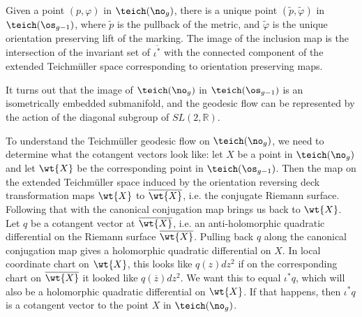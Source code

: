 \documentclass[12pt, reqno]{amsart}
\begin{document}
\begin{theorem}
  \label{thm:embedding-teich}
  Given a point $(p, \varphi)$ in $\teich(\no_g)$, there is a unique point $(\widetilde{p}, \widetilde{\varphi})$ in $\teich(\os_{g-1})$, where $\widetilde{p}$ is the pullback of the metric, and $\widetilde{\varphi}$ is the unique orientation preserving lift of the marking. The image of the inclusion map is the intersection of the invariant set of $\overline{\iota^\ast}$ with the connected component of the extended Teichmüller space corresponding to orientation preserving maps.
\end{theorem}

It turns out that the image of $\teich(\no_g)$ in $\teich(\os_{g-1})$ is an isometrically embedded submanifold, and the geodesic flow can be represented by the action of the diagonal subgroup of $SL(2, \mathbb{R})$.

To understand the Teichm\"uller geodesic flow on $\teich(\no_g)$, we need to determine what the cotangent vectors look like: let $X$ be a point in $\teich(\no_{g})$ and let $\wt{X}$ be the corresponding point in $\teich(\os_{g-1})$.
Then the map on the extended Teichmüller space induced by the orientation reversing deck transformation maps $\wt{X}$ to $\overline{\wt{X}}$, i.e. the conjugate Riemann surface. Following that with the canonical conjugation map brings us back to $\wt{X}$.
Let $q$ be a cotangent vector at $\overline{\wt{X}}$, i.e. an anti-holomorphic quadratic differential on the Riemann surface $\overline{\wt{X}}$.
Pulling back $q$ along the canonical conjugation map gives a holomorphic quadratic differential on $X$.
In local coordinate chart on $\wt{X}$, this looks like $q(z) dz^2$ if on the corresponding chart on $\overline{\wt{X}}$ it looked like $q(\overline{z}) dz^2$.
We want this to equal $\iota^{\ast}q$, which will also be a holomorphic quadratic differential on $\wt{X}$.
If that happens, then $\iota^{\ast} q$ is a cotangent vector to the point $X$ in $\teich(\no_g)$.
\end{document}
